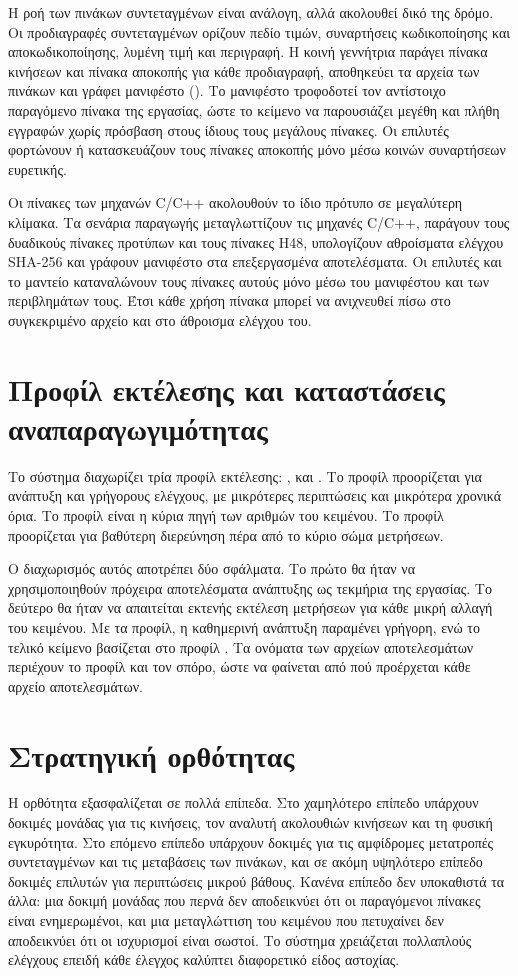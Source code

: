 Η ροή των πινάκων συντεταγμένων είναι ανάλογη, αλλά ακολουθεί δικό της δρόμο. Οι προδιαγραφές συντεταγμένων ορίζουν πεδίο τιμών, συναρτήσεις κωδικοποίησης και αποκωδικοποίησης, λυμένη τιμή και περιγραφή. Η κοινή γεννήτρια παράγει πίνακα κινήσεων και πίνακα αποκοπής για κάθε προδιαγραφή, αποθηκεύει τα αρχεία των πινάκων και γράφει μανιφέστο (). Το μανιφέστο τροφοδοτεί τον αντίστοιχο παραγόμενο πίνακα της εργασίας, ώστε το κείμενο να παρουσιάζει μεγέθη και πλήθη εγγραφών χωρίς πρόσβαση στους ίδιους τους μεγάλους πίνακες. Οι επιλυτές φορτώνουν ή κατασκευάζουν τους πίνακες αποκοπής μόνο μέσω κοινών συναρτήσεων ευρετικής.

Οι πίνακες των μηχανών C/C++ ακολουθούν το ίδιο πρότυπο σε μεγαλύτερη κλίμακα. Τα σενάρια παραγωγής μεταγλωττίζουν τις μηχανές C/C++, παράγουν τους δυαδικούς πίνακες προτύπων και τους πίνακες H48, υπολογίζουν αθροίσματα ελέγχου SHA-256 και γράφουν μανιφέστο στα επεξεργασμένα αποτελέσματα. Οι επιλυτές και το μαντείο καταναλώνουν τους πίνακες αυτούς μόνο μέσω του μανιφέστου και των περιβλημάτων τους. Έτσι κάθε χρήση πίνακα μπορεί να ανιχνευθεί πίσω στο συγκεκριμένο αρχείο και στο άθροισμα ελέγχου του.

\section{Προφίλ εκτέλεσης και καταστάσεις αναπαραγωγιμότητας}
\label{sec:design-profiles}
Το σύστημα διαχωρίζει τρία προφίλ εκτέλεσης: ,  και . Το προφίλ  προορίζεται για ανάπτυξη και γρήγορους ελέγχους, με μικρότερες περιπτώσεις και μικρότερα χρονικά όρια. Το προφίλ  είναι η κύρια πηγή των αριθμών του κειμένου. Το προφίλ  προορίζεται για βαθύτερη διερεύνηση πέρα από το κύριο σώμα μετρήσεων.

Ο διαχωρισμός αυτός αποτρέπει δύο σφάλματα. Το πρώτο θα ήταν να χρησιμοποιηθούν πρόχειρα αποτελέσματα ανάπτυξης ως τεκμήρια της εργασίας. Το δεύτερο θα ήταν να απαιτείται εκτενής εκτέλεση μετρήσεων για κάθε μικρή αλλαγή του κειμένου. Με τα προφίλ, η καθημερινή ανάπτυξη παραμένει γρήγορη, ενώ το τελικό κείμενο βασίζεται στο προφίλ . Τα ονόματα των αρχείων αποτελεσμάτων περιέχουν το προφίλ και τον σπόρο, ώστε να φαίνεται από πού προέρχεται κάθε αρχείο αποτελεσμάτων.

\section{Στρατηγική ορθότητας}
\label{sec:design-correctness}
Η ορθότητα εξασφαλίζεται σε πολλά επίπεδα. Στο χαμηλότερο επίπεδο υπάρχουν δοκιμές μονάδας για τις κινήσεις, τον αναλυτή ακολουθιών κινήσεων και τη φυσική εγκυρότητα. Στο επόμενο επίπεδο υπάρχουν δοκιμές για τις αμφίδρομες μετατροπές συντεταγμένων και τις μεταβάσεις των πινάκων, και σε ακόμη υψηλότερο επίπεδο δοκιμές επιλυτών για περιπτώσεις μικρού βάθους. Κανένα επίπεδο δεν υποκαθιστά τα άλλα: μια δοκιμή μονάδας που περνά δεν αποδεικνύει ότι οι παραγόμενοι πίνακες είναι ενημερωμένοι, και μια μεταγλώττιση του κειμένου που πετυχαίνει δεν αποδεικνύει ότι οι ισχυρισμοί είναι σωστοί. Το σύστημα χρειάζεται πολλαπλούς ελέγχους επειδή κάθε έλεγχος καλύπτει διαφορετικό είδος αστοχίας.

